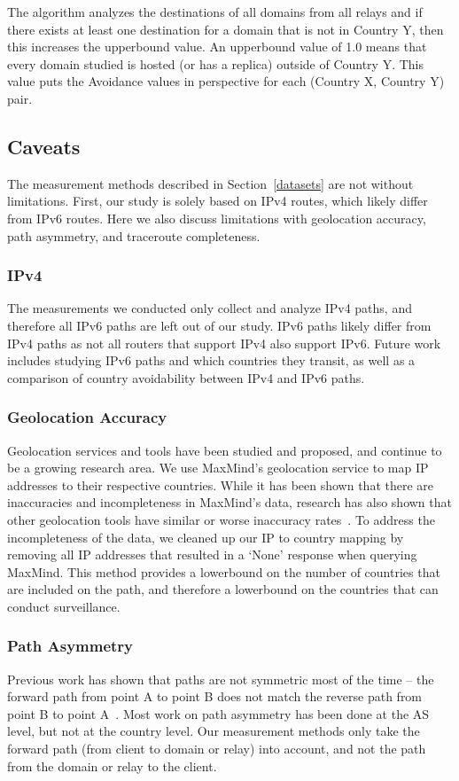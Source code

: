The algorithm analyzes the destinations of all domains from all relays and if there exists at least one destination for a domain that is not in Country Y, then this increases the upperbound value.  An upperbound value of 1.0 means that every domain studied is hosted (or has a replica) outside of Country Y.  This value puts the Avoidance values in perspective for each (Country X, Country Y) pair.  

\subsection{Caveats}
The measurement methods described in Section~\ref{datasets} are not without limitations.  First, our study is solely based on IPv4 routes, which likely differ from IPv6 routes.  Here we also discuss limitations with geolocation accuracy, path asymmetry, and traceroute completeness.

\subsubsection{IPv4}
The measurements we conducted only collect and analyze IPv4 paths, and therefore all IPv6 paths are left out of our study.  IPv6 paths likely differ from IPv4 paths as not all routers that support IPv4 also support IPv6.  Future work includes studying IPv6 paths and which countries they transit, as well as a comparison of country avoidability between IPv4 and IPv6 paths. 

\subsubsection{Geolocation Accuracy}
Geolocation services and tools have been studied and proposed, and continue to be a growing research area.  We use MaxMind's geolocation service to map IP addresses to their respective countries.  While it has been shown that there are inaccuracies and incompleteness in MaxMind's data, research has also shown that other geolocation tools have similar or worse inaccuracy rates~\cite{huffaker2011geocompare}.  To address the incompleteness of the data, we cleaned up our IP to country mapping by removing all IP addresses that resulted in a `None' response when querying MaxMind.  This method provides a lowerbound on the number of countries that are included on the path, and therefore a lowerbound on the countries that can conduct surveillance.  

\subsubsection{Path Asymmetry}
Previous work has shown that paths are not symmetric most of the time -- the forward path from point A to point B does not match the reverse path from point B to point A~\cite{he2005routing}.  Most work on path asymmetry has been done at the AS level, but not at the country level.  Our measurement methods only take the forward path (from client to domain or relay) into account, and not the path from the domain or relay to the client.  

